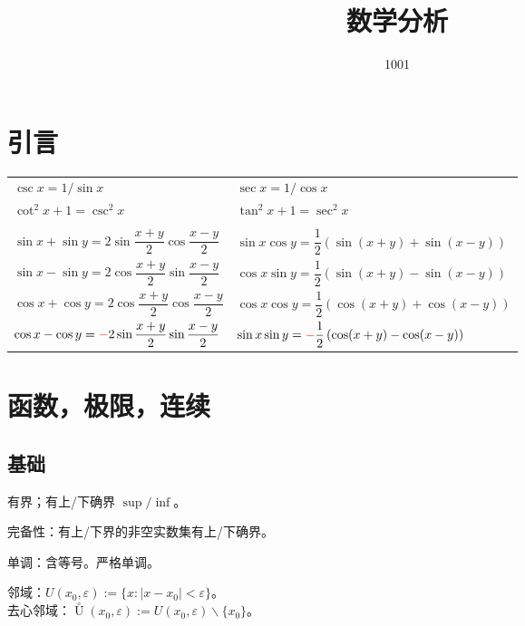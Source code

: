 \documentclass[12pt, a4paper, UTF8, openany]{ctexbook}
\title{数学分析}
\author{1001}
\newcommand{\uzero}{\mathop{U}\limits^{\circ}}%
\newcommand{\eps}{\varepsilon}
\begin{document}
    \maketitle

    \tableofcontents
    \cleardoublepage

    \chapter{引言}
    \begin{longtable}[2]{*{2}{w{l}{9cm}}}
        $\csc x = 1 / \sin x$ & $\sec x = 1 / \cos x$ \\
        $\cot^2 x + 1 = \csc^2 x$ & $\tan^2 x + 1 = \sec^2 x$ \\
        & \\
        $\sin x + \sin y = 2 \sin \dfrac{x + y}{2} \cos \dfrac{x - y}{2}$ & 
        $\sin x \cos y = \dfrac{1}{2}\left(\sin(x + y) + \sin(x - y)\right)$ \\
        \addlinespace
        $\sin x - \sin y = 2 \cos \dfrac{x + y}{2} \sin \dfrac{x - y}{2}$ & 
        $\cos x \sin y = \dfrac{1}{2}\left(\sin(x + y) - \sin(x - y)\right)$ \\
        \addlinespace
        $\cos x + \cos y = 2 \cos \dfrac{x + y}{2} \cos \dfrac{x - y}{2}$ &
        $\cos x \cos y = \dfrac{1}{2}\left(\cos(x + y) + \cos(x - y)\right)$ \\
        \addlinespace
        $\cos x - \cos y = {\color{red}-}2 \sin \dfrac{x + y}{2} \sin \dfrac{x - y}{2}$ &
        $\sin x \sin y = {\color{red}-}\dfrac{1}{2}\left(\cos(x + y) - \cos(x - y)\right)$
    \end{longtable}

    \chapter{函数，极限，连续}

    \section{基础}
    有界；有上/下确界 $\sup / \inf$。

    {\heiti 完备性}：有上/下界的非空实数集有上/下确界。

    单调：含等号。严格单调。

    邻域：$U(x_0, \eps) := \{x : |x - x_0| < \eps\}$。\\
    去心邻域：$\uzero(x_0, \eps) := U(x_0, \eps) \backslash \{x_0\}$。
    
\end{document}
